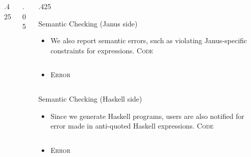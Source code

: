 \documentclass[final,hyperref={pdfpagelabels=false}]{beamer}
\newcommand\sepsize{.05\textwidth}
\newcommand\colsize{.425\textwidth}
\newcommand{\code}[1]{\inputminted[frame=lines,framesep=1cm,baselinestretch=.9,linenos,fontsize=\scriptsize]{haskell}{code/#1.hs}}
\newcommand{\codeErr}[1]{\inputminted[frame=lines,framesep=1cm,baselinestretch=.9,fontsize=\scriptsize]{bash}{code/#1_err.hs}}
\begin{document}
\begin{frame}[t]
\begin{columns}[t]
\begin{column}{\colsize}

\end{column} %

\begin{column}{\sepsize}\end{column} %
 
\begin{column}{\colsize} %


\begin{block}{Semantic Checking (Janus side)}
	\begin{itemize}
		\item We also report semantic errors, such as violating Janus-specific constraints for expressions.
		\center
		\textsc{\small Code}\\ \vspace{1cm}
		\begin{minipage}{.8\textwidth}
		\code{semJ}
		\end{minipage}
		\vspace{1cm}
		\item \textsc{\small Error}\\ \vspace{1cm}
		\begin{minipage}{.8\textwidth}
		\codeErr{semJ}
		\end{minipage}
	\end{itemize}
\end{block}

\begin{block}{Semantic Checking (Haskell side)}
	\begin{itemize}
		\item Since we generate Haskell programs, users are also notified for error made in anti-quoted Haskell expressions.
		\center
		\textsc{\small Code}\\ \vspace{1cm}
		\begin{minipage}{.8\textwidth}
		\code{semH}
		\end{minipage}
		\vspace{1cm}
		\item \textsc{\small Error}\\ \vspace{1cm}
		\begin{minipage}{.8\textwidth}
		\codeErr{semH}
		\end{minipage}
	\end{itemize}     
\end{block}


\end{column}
\end{columns}
\end{frame}
\end{document}
